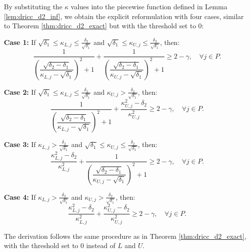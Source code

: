 \documentclass[preprint,12pt,authoryear]{elsarticle}
\begin{document}
By substituting the $\kappa$ values into the piecewise function defined in Lemma \ref{lem:dricc_d2_inf}, we obtain the explicit reformulation with four cases, similar to Theorem \ref{thm:dricc_d2_exact} but with the threshold set to 0:

\textbf{Case 1:} If $\sqrt{\delta_1} \leqslant \kappa_{L,j} \leqslant \frac{\delta_2}{\sqrt{\delta_1}}$ and $\sqrt{\delta_1} \leqslant \kappa_{U,j} \leqslant \frac{\delta_2}{\sqrt{\delta_1}}$, then:
\begin{equation}
\dfrac{1}{\left( \dfrac{\sqrt{\delta_2 - \delta_1}}{\kappa_{L,j} - \sqrt{\delta_1}} \right)^{2} + 1} + \dfrac{1}{\left( \dfrac{\sqrt{\delta_2 - \delta_1}}{\kappa_{U,j} - \sqrt{\delta_1}} \right)^{2} + 1} \geqslant 2 - \gamma, \quad \forall j \in P.
\label{eq:rel_balance_d2_exact_case1}
\end{equation}

\textbf{Case 2:} If $\sqrt{\delta_1} \leqslant \kappa_{L,j} \leqslant \frac{\delta_2}{\sqrt{\delta_1}}$ and $\kappa_{U,j} > \frac{\delta_2}{\sqrt{\delta_1}}$, then:
\begin{equation}
\dfrac{1}{\left( \dfrac{\sqrt{\delta_2 - \delta_1}}{\kappa_{L,j} - \sqrt{\delta_1}} \right)^{2} + 1} + \dfrac{\kappa_{U,j}^{2} - \delta_2}{\kappa_{U,j}^{2}} \geqslant 2 - \gamma, \quad \forall j \in P.
\label{eq:rel_balance_d2_exact_case2}
\end{equation}

\textbf{Case 3:} If $\kappa_{L,j} > \frac{\delta_2}{\sqrt{\delta_1}}$ and $\sqrt{\delta_1} \leqslant \kappa_{U,j} \leqslant \frac{\delta_2}{\sqrt{\delta_1}}$, then:
\begin{equation}
\dfrac{\kappa_{L,j}^{2} - \delta_2}{\kappa_{L,j}^{2}} + \dfrac{1}{\left( \dfrac{\sqrt{\delta_2 - \delta_1}}{\kappa_{U,j} - \sqrt{\delta_1}} \right)^{2} + 1} \geqslant 2 - \gamma, \quad \forall j \in P.
\label{eq:rel_balance_d2_exact_case3}
\end{equation}

\textbf{Case 4:} If $\kappa_{L,j} > \frac{\delta_2}{\sqrt{\delta_1}}$ and $\kappa_{U,j} > \frac{\delta_2}{\sqrt{\delta_1}}$, then:
\begin{equation}
\dfrac{\kappa_{L,j}^{2} - \delta_2}{\kappa_{L,j}^{2}} + \dfrac{\kappa_{U,j}^{2} - \delta_2}{\kappa_{U,j}^{2}} \geqslant 2 - \gamma, \quad \forall j \in P.
\label{eq:rel_balance_d2_exact_case4}
\end{equation}

The derivation follows the same procedure as in Theorem \ref{thm:dricc_d2_exact}, with the threshold set to 0 instead of $L$ and $U$.
\end{document}
